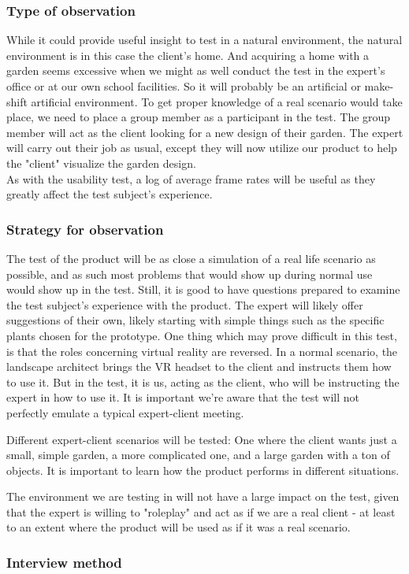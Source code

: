 \subsubsection{Type of observation}

While it could provide useful insight to test in a natural environment, the natural environment is in this case the client's home. And acquiring a home with a garden seems excessive when we might as well conduct the test in the expert's office or at our own school facilities. So it will probably be an artificial or make-shift artificial environment. To get proper knowledge of a real scenario would take place, we need to place a group member as a participant in the test. The group member will act as the client looking for a new design of their garden. The expert will carry out their job as usual, except they will now utilize our product to help the "client" visualize the garden design.\\
As with the usability test, a log of average frame rates will be useful as they greatly affect the test subject's experience. 

\subsubsection{Strategy for observation}
The test of the product will be as close a simulation of a real life scenario as possible, and as such most problems that would show up during normal use would show up in the test. Still, it is good to have questions prepared to examine the test subject's experience with the product. The expert will likely offer suggestions of their own, likely starting with simple things such as the specific plants chosen for the prototype. 
One thing which may prove difficult in this test, is that the roles concerning virtual reality are reversed. In a normal scenario, the landscape architect brings the VR headset to the client and instructs them how to use it. But in the test, it is us, acting as the client, who will be instructing the expert in how to use it. It is important we're aware that the test will not perfectly emulate a typical expert-client meeting. 

Different expert-client scenarios will be tested: One where the client wants just a small, simple garden, a more complicated one, and a large garden with a ton of objects. It is important to learn how the product performs in different situations. 

The environment we are testing in will not have a large impact on the test, given that the expert is willing to "roleplay" and act as if we are a real client - at least to an extent where the product will be used as if it was a real scenario. 


\subsubsection{Interview method}

